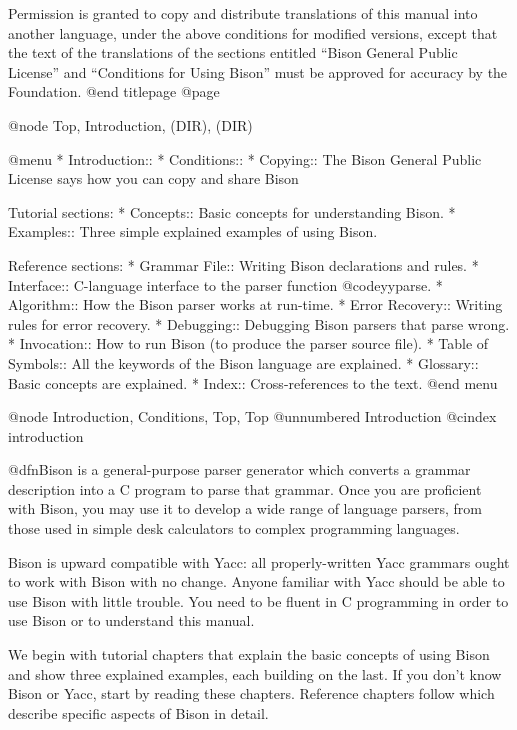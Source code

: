 Permission is granted to copy and distribute translations of this manual
into another language, under the above conditions for modified versions,
except that the text of the translations of the sections entitled ``Bison
General Public License'' and ``Conditions for Using Bison'' must be
approved for accuracy by the Foundation.
@end titlepage
@page

@node Top, Introduction, (DIR), (DIR)

@menu
* Introduction::
* Conditions::
* Copying::           The Bison General Public License says
                        how you can copy and share Bison

Tutorial sections:
* Concepts::          Basic concepts for understanding Bison.
* Examples::          Three simple explained examples of using Bison.

Reference sections:
* Grammar File::      Writing Bison declarations and rules.
* Interface::         C-language interface to the parser function @code{yyparse}.
* Algorithm::         How the Bison parser works at run-time.
* Error Recovery::    Writing rules for error recovery.
* Debugging::         Debugging Bison parsers that parse wrong.
* Invocation::        How to run Bison (to produce the parser source file).
* Table of Symbols::  All the keywords of the Bison language are explained.
* Glossary::          Basic concepts are explained.
* Index::             Cross-references to the text.
@end menu

@node Introduction, Conditions, Top, Top
@unnumbered Introduction
@cindex introduction
 
@dfn{Bison} is a general-purpose parser generator which converts a grammar
description into a C program to parse that grammar.  Once you are
proficient with Bison, you may use it to develop a wide range of language
parsers, from those used in simple desk calculators to complex programming
languages.

Bison is upward compatible with Yacc: all properly-written Yacc grammars
ought to work with Bison with no change.  Anyone familiar with Yacc
should be able to use Bison with little trouble.  You need to be fluent in
C programming in order to use Bison or to understand this manual.

We begin with tutorial chapters that explain the basic concepts of using
Bison and show three explained examples, each building on the last.  If you
don't know Bison or Yacc, start by reading these chapters.  Reference
chapters follow which describe specific aspects of Bison in detail.

